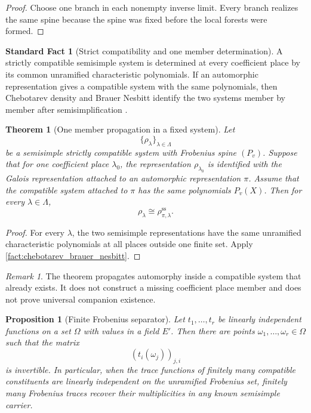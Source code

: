 \documentclass{aomart}
\newtheorem{theorem}{Theorem}[section]
\newtheorem{proposition}[proposition]{Proposition}
\theoremstyle{definition}
\newtheorem{standardfact}[standardfact]{Standard Fact}
\theoremstyle{remark}
\newtheorem{remark}[remark]{Remark}
\begin{document}
\begin{proof}
Choose one branch in each nonempty inverse limit. Every branch realizes the same spine because the spine was fixed before the local forests were formed.
\end{proof}

\begin{standardfact}[Strict compatibility and one member determination]\label{fact:strict_compatibility}
A strictly compatible semisimple system is determined at every coefficient place by its common unramified characteristic polynomials. If an automorphic representation gives a compatible system with the same polynomials, then Chebotarev density and Brauer Nesbitt identify the two systems member by member after semisimplification
\cite{Serre1977,BarnetLambGeeGeraghtyTaylor2014}.
\end{standardfact}

\begin{theorem}[One member propagation in a fixed system]\label{thm:one_member_propagation}
Let
\[
\{\rho_\lambda\}_{\lambda\in\Lambda}
\]
be a semisimple strictly compatible system with Frobenius spine \((P_v)\). Suppose that for one coefficient place \(\lambda_0\), the representation \(\rho_{\lambda_0}\) is identified with the Galois representation attached to an automorphic representation \(\pi\). Assume that the compatible system attached to \(\pi\) has the same polynomials \(P_v(X)\). Then for every \(\lambda\in\Lambda\),
\[
\boxed{
\rho_\lambda
\cong
\rho_{\pi,\lambda}^{\mathrm{ss}}.
}
\]
\end{theorem}

\begin{proof}
For every \(\lambda\), the two semisimple representations have the same unramified characteristic polynomials at all places outside one finite set. Apply \cref{fact:chebotarev_brauer_nesbitt}.
\end{proof}

\begin{remark}
The theorem propagates automorphy inside a compatible system that already exists. It does not construct a missing coefficient place member and does not prove universal companion existence.
\end{remark}

\begin{proposition}[Finite Frobenius separator]\label{prop:finite_frobenius_separator}
Let \(t_1,\ldots,t_r\) be linearly independent functions on a set \(\Omega\) with values in a field \(E'\). Then there are points
\(\omega_1,\ldots,\omega_r\in\Omega\) such that the matrix
\[
\left(t_i(\omega_j)\right)_{j,i}
\]
is invertible. In particular, when the trace functions of finitely many compatible constituents are linearly independent on the unramified Frobenius set, finitely many Frobenius traces recover their multiplicities in any known semisimple carrier.
\end{proposition}
\end{document}
